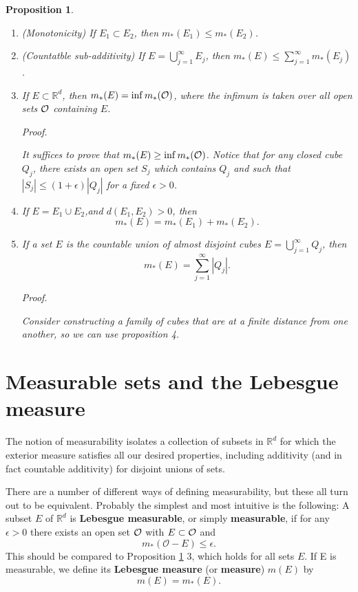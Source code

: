 \documentclass[
]{book}
\providecommand{\tightlist}{%
  \setlength{\itemsep}{0pt}\setlength{\parskip}{0pt}}
\newtheorem{proposition}{Proposition}[chapter]
\theoremstyle{definition}
\theoremstyle{definition}
\theoremstyle{definition}
\theoremstyle{definition}
\theoremstyle{remark}
\begin{document}
\begin{proposition}
\protect\hypertarget{prp:pem}{}\label{prp:pem}\leavevmode

\begin{enumerate}
\def\labelenumi{\arabic{enumi}.}
\tightlist
\item
  (Monotonicity) If \(E_1\subset E_2\), then \(m_{\ast}(E_1)\leq m_{\ast}(E_2)\).
\item
  (Countatble sub-additivity) If \(E= \bigcup_{j=1}^{\infty}E_j\), then \(m_{\ast}(E)\leq\sum_{j=1}^{\infty}m_{\ast}(E_j)\).
\item
  If \(E\subset\mathbb{R}^d\), then \(m_{\ast}(E)=\inf m_{\ast}(\cal O)\), where the infimum is taken over all open sets \(\cal O\) containing \(E\).

  \emph{Proof.}

  It suffices to prove that \(m_{\ast}(E)\geq \inf m_{\ast}(\cal O)\). Notice that for any closed cube \(Q_j\), there exists an open set \(S_j\) which contains \(Q_j\) and such that \(|S_j|\leq (1+\epsilon)|Q_j|\) for a fixed \(\epsilon>0\).
\item
  If \(E=E_1\cup E_2\),and \(d(E_1,E_2)>0\), then
  \[
   m_{\ast}(E)=  m_{\ast}(E_1)+  m_{\ast}(E_2).
  \]
\item
  If a set \(E\) is the countable union of almost disjoint cubes \(E=\bigcup_{j=1}^{\infty}Q_j\), then
  \[
  m_{\ast}(E) = \sum_{j=1}^{\infty}|Q_j|.
  \]

  \emph{Proof.}

  Consider constructing a family of cubes that are at a finite distance from one another, so we can use proposition 4.
\end{enumerate}

\end{proposition}

\section{Measurable sets and the Lebesgue measure}\label{measurable-sets-and-the-lebesgue-measure}

The notion of measurability isolates a collection of subsets in \(\mathbb{R}^d\) for which the exterior measure satisfies all our desired properties, including additivity (and in fact countable additivity) for disjoint unions of sets.

There are a number of different ways of defining measurability, but these all turn out to be equivalent. Probably the simplest and most intuitive is the following: A subset \(E\) of \(\mathbb{R}^d\) is \textbf{Lebesgue measurable}, or simply \textbf{measurable}, if for any \(\epsilon > 0\) there exists an open set \(\cal O\) with \(E\subset\cal O\) and
\[
m_{\ast}(\mathcal{O}-E) ≤ \epsilon.
\]
This should be compared to Proposition \ref{prp:pem} 3, which holds for all sets \(E\). If E is measurable, we define its \textbf{Lebesgue measure} (or \textbf{measure}) \(m(E)\) by
\[
m(E)=m_{\ast}(E).
\]
\end{document}
